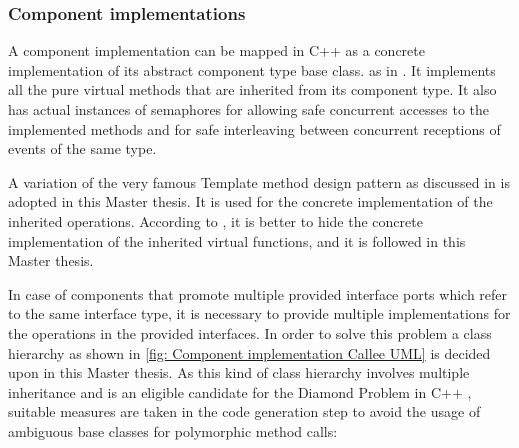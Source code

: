 \subsubsection{\textbf{Component implementations}}
A component implementation can be mapped in C++ as a concrete implementation of its abstract component type base class. as in \cite{EvoRAVCodeAr}. It implements all the pure virtual methods that are inherited from its component type. It also has actual instances of semaphores for allowing safe concurrent accesses to the implemented methods and for safe interleaving between concurrent receptions of events of the same type.

A variation of the very famous Template method design pattern as discussed in \cite{TemplatePattern} is adopted in this Master thesis. It is used for the concrete implementation of the inherited operations. According to \cite{TemplatePattern}, it is better to hide the concrete implementation of the inherited virtual functions, and it is followed in this Master thesis.  

In case of components that promote multiple provided interface ports which refer to the same interface type, it is necessary to provide multiple implementations for the operations in the provided interfaces. In order to solve this problem a class hierarchy as shown in \cref{fig: Component implementation Callee UML} is decided upon in this Master thesis. As this kind of class hierarchy involves multiple inheritance and is an eligible candidate for the Diamond Problem in C++ \cite{DiamondProblem}, suitable measures are taken in the code generation step to avoid the usage of ambiguous base classes for polymorphic method calls:

